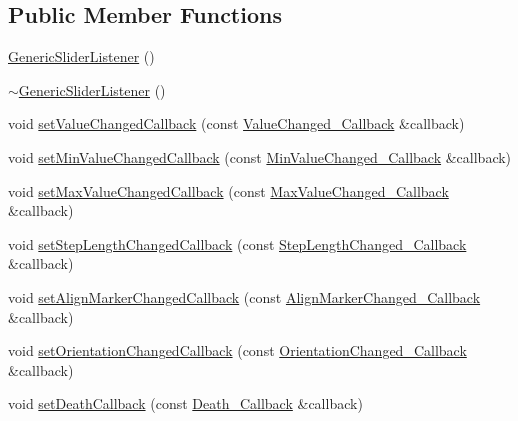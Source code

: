 \subsection*{Public Member Functions}
\begin{DoxyCompactItemize}
\item 
\mbox{\hyperlink{classec_1_1_generic_slider_listener_a881730b68b84ec908cc8447715df6a26}{Generic\+Slider\+Listener}} ()
\item 
\mbox{\hyperlink{classec_1_1_generic_slider_listener_af9d1b2fd67c2236950322e5863620a35}{$\sim$\+Generic\+Slider\+Listener}} ()
\item 
void \mbox{\hyperlink{classec_1_1_generic_slider_listener_a1f01d60c85706082ddc4372d919e42c7}{set\+Value\+Changed\+Callback}} (const \mbox{\hyperlink{classec_1_1_generic_slider_listener_ab4562c9d0ca6599598d872bf6fb45cfb}{Value\+Changed\+\_\+\+Callback}} \&callback)
\item 
void \mbox{\hyperlink{classec_1_1_generic_slider_listener_ac2f53157eab94c6221589bfe5decf291}{set\+Min\+Value\+Changed\+Callback}} (const \mbox{\hyperlink{classec_1_1_generic_slider_listener_a16d9612be31a0bbb0cc931c87ca43503}{Min\+Value\+Changed\+\_\+\+Callback}} \&callback)
\item 
void \mbox{\hyperlink{classec_1_1_generic_slider_listener_acbec72068b224d414a26dab1d3351dc0}{set\+Max\+Value\+Changed\+Callback}} (const \mbox{\hyperlink{classec_1_1_generic_slider_listener_a73ad440b637c2ce8b6f094702d9c3cf3}{Max\+Value\+Changed\+\_\+\+Callback}} \&callback)
\item 
void \mbox{\hyperlink{classec_1_1_generic_slider_listener_a8d809cb4d2f8c7af475e30f329a2aa95}{set\+Step\+Length\+Changed\+Callback}} (const \mbox{\hyperlink{classec_1_1_generic_slider_listener_afde2dc39404d84bb597b9cc4be265814}{Step\+Length\+Changed\+\_\+\+Callback}} \&callback)
\item 
void \mbox{\hyperlink{classec_1_1_generic_slider_listener_a999e3c26a33662561d6050f3b28095bb}{set\+Align\+Marker\+Changed\+Callback}} (const \mbox{\hyperlink{classec_1_1_generic_slider_listener_a0b14e921e56b7dfc0a23af21f9921e0c}{Align\+Marker\+Changed\+\_\+\+Callback}} \&callback)
\item 
void \mbox{\hyperlink{classec_1_1_generic_slider_listener_a9238f89911356a87747be1b80a732c2a}{set\+Orientation\+Changed\+Callback}} (const \mbox{\hyperlink{classec_1_1_generic_slider_listener_af0bd5763136a162c785fc2e37be42fed}{Orientation\+Changed\+\_\+\+Callback}} \&callback)
\item 
void \mbox{\hyperlink{classec_1_1_generic_slider_listener_a97f72024d5046bdc7f473830f43a531e}{set\+Death\+Callback}} (const \mbox{\hyperlink{classec_1_1_generic_slider_listener_a73457456f87df632db463dbab48980ad}{Death\+\_\+\+Callback}} \&callback)

\end{DoxyCompactItemize}
